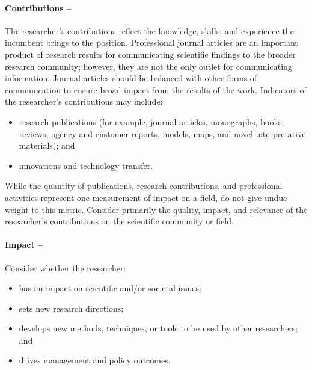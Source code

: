 \paragraph*{Contributions --} The researcher's contributions reflect the knowledge, skills, and experience the 
incumbent brings to the position.
Professional journal articles are an important product of research results for communicating scientific findings to the broader research community; 
however, they are not the only outlet for communicating information.
Journal articles should be balanced with other forms of communication to ensure broad impact from the results of the 
work.
Indicators of the researcher's contributions may include:
\begin{itemize}
\item research publications (for example, journal articles, monographs, books, reviews, agency 
and customer reports, models, maps, and novel interpretative materials); and 
\item innovations and technology transfer.
\end{itemize}

While the quantity of publications, research contributions, and
professional activities represent one measurement of impact on a
field, do not give undue weight to this metric.
Consider primarily the quality, impact, and relevance of the researcher's contributions on the scientific 
community or field.

\paragraph*{Impact -- } Consider whether the researcher: 
\begin{itemize}
\item has an impact on scientific and/or societal issues; 
\item sets new research directions; 
\item develops new methods, techniques, or tools to be used by other researchers; and 
\item drives management and policy outcomes.
\end{itemize}

